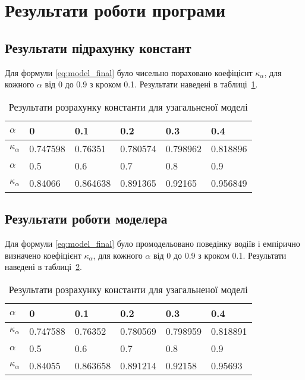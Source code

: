 \section{Результати роботи програми}
\label{sec:result_analyse}
\jointitles
\subsection{Результати підрахунку констант}
Для формули \eqref{eq:model_final} було чисельно пораховано коефіцієнт $\kappa_\alpha$, для кожного $\alpha$ від 0 до 0.9 з кроком 0.1. Результати наведені в таблиці~\ref{tab:model_integral_result}.

\begin{table}[ht]
	\caption{Результати розрахунку константи для узагальненої моделі}
	\centering
\begin{tabular}{|p{}|p{}|p{}|p{}|p{}|p{}|}
	\hline
	$\alpha$ & 0 & 0.1 & 0.2 & 0.3 & 0.4 \\
	\hline
	$\kappa_\alpha$ & 0.747598 &0.76351 &0.780574 &0.798962 &0.818896  \\
	\hline
	\hline
	$\alpha$  & 0.5 & 0.6 & 0.7 & 0.8 & 0.9\\
	\hline
	$\kappa_\alpha$  &0.84066 &0.864638 &0.891365 &0.92165 &0.956849 \\
	\hline
\end{tabular}	
	\label{tab:model_integral_result}
\end{table}

\subsection{Результати роботи моделера}

Для формули \eqref{eq:model_final} було промодельовано поведінку водіїв і емпірично визначено коефіцієнт $\kappa_\alpha$, для кожного $\alpha$ від 0 до 0.9 з кроком 0.1. Результати наведені в таблиці~\ref{tab:model_simulation_result}.

\begin{table}[ht]
	\caption{Результати розрахунку константи для узагальненої моделі}
	\centering
\begin{tabular}{|p{}|p{}|p{}|p{}|p{}|p{}|}
	\hline
	$\alpha$ & 0 & 0.1 & 0.2 & 0.3 & 0.4 \\
	\hline
	$\kappa_\alpha$ & 0.747588 &0.76352 &0.780569 &0.798959 &0.818891  \\
	\hline
	\hline
	$\alpha$  & 0.5 & 0.6 & 0.7 & 0.8 & 0.9\\
	\hline
	$\kappa_\alpha$  &0.84055 &0.863658 &0.891214 &0.92158 &0.95693 \\
	\hline
\end{tabular}	
	\label{tab:model_simulation_result}
\end{table}

